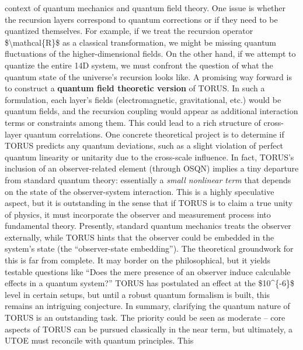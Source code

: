 \documentclass[
]{article}
\begin{document}
\begin{itemize}
  context of quantum mechanics and quantum field theory. One issue is
  whether the recursion layers correspond to quantum corrections or if
  they need to be quantized themselves. For example, if we treat the
  recursion operator \$\textbackslash mathcal\{R\}\$ as a classical
  transformation, we might be missing quantum fluctuations of the
  higher-dimensional fields. On the other hand, if we attempt to
  quantize the entire 14D system, we must confront the question of what
  the quantum state of the universe's recursion looks like. A promising
  way forward is to construct a \textbf{quantum field theoretic version}
  of TORUS\hspace{0pt}. In such a formulation, each layer's fields
  (electromagnetic, gravitational, etc.) would be quantum fields, and
  the recursion coupling would appear as additional interaction terms or
  constraints among them. This could lead to a rich structure of
  cross-layer quantum correlations. One concrete theoretical project is
  to determine if TORUS predicts any quantum deviations, such as a
  slight violation of perfect quantum linearity or unitarity due to the
  cross-scale influence. In fact, TORUS's inclusion of an
  observer-related element (through OSQN) implies a tiny departure from
  standard quantum theory: essentially a \emph{small nonlinear term}
  that depends on the state of the observer-system
  interaction\hspace{0pt}. This is a highly speculative aspect, but it
  is outstanding in the sense that if TORUS is to claim a true unity of
  physics, it must incorporate the observer and measurement process into
  fundamental theory. Presently, standard quantum mechanics treats the
  observer externally, while TORUS hints that the observer could be
  embedded in the system's state (the ``observer-state
  embedding'')\hspace{0pt}. The theoretical groundwork for this is far
  from complete. It may border on the philosophical, but it yields
  testable questions like ``Does the mere presence of an observer induce
  calculable effects in a quantum system?'' TORUS has postulated an
  effect at the \$10\^{}\{-6\}\$ level in certain setups\hspace{0pt},
  but until a robust quantum formalism is built, this remains an
  intriguing conjecture. In summary, clarifying the quantum nature of
  TORUS is an outstanding task. The priority could be seen as moderate
  -- core aspects of TORUS can be pursued classically in the near term,
  but ultimately, a UTOE must reconcile with quantum principles. This

\end{itemize}
\end{document}
